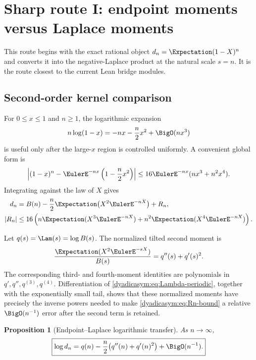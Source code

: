 \documentclass[11pt,oneside]{article}
\newtheorem{proposition}[proposition]{Proposition}
\theoremstyle{definition}
\theoremstyle{remark}
\begin{document}
\section{Sharp route I: endpoint moments versus Laplace moments}
\label{dyadicasym:sec:endpoint-laplace}

This route begins with the exact rational object $d_n=\Expectation(1-X)^n$ and converts it into the
negative-Laplace product at the natural scale $s=n$.  It is the route closest to the current
Lean bridge modules.

\subsection{Second-order kernel comparison}

For $0\le x\le1$ and $n\ge1$, the logarithmic expansion
\begin{equation*}
 n\log(1-x)=-nx-\frac n2x^2+\BigO(nx^3)
\end{equation*}
is useful only after the large-$x$ region is controlled uniformly.  A convenient global
form is
\begin{equation}
 \left|(1-x)^n-\EulerE^{-nx}\left(1-\frac n2x^2\right)\right|
 \le16\EulerE^{-nx}(nx^3+n^2x^4).                               \label{dyadicasym:eq:kernel-comparison}
\end{equation}
Integrating against the law of $X$ gives
\begin{align}
 d_n={}&B(n)-\frac n2\Expectation\bigl(X^2\EulerE^{-nX}\bigr)+R_n,        \label{dyadicasym:eq:dn-B-second}\\
 |R_n|\le{}&16\left(
 n\Expectation(X^3\EulerE^{-nX})+n^2\Expectation(X^4\EulerE^{-nX})\right).              \label{dyadicasym:eq:Rn-bound}
\end{align}

Let $q(s)=\Lam(s)=\log B(s)$.  The normalized tilted second moment is
\begin{equation}
 \frac{\Expectation(X^2\EulerE^{-sX})}{B(s)}=q''(s)+q'(s)^2.               \label{dyadicasym:eq:tilted-second}
\end{equation}
The corresponding third- and fourth-moment identities are polynomials in
$q',q'',q^{(3)},q^{(4)}$.  Differentiation of \eqref{dyadicasym:eq:Lambda-periodic}, together with the
exponentially small tail, shows that these normalized moments have precisely the inverse
powers needed to make \eqref{dyadicasym:eq:Rn-bound} a relative $\BigO(n^{-1})$ error after the second
term is retained.

\begin{proposition}[Endpoint--Laplace logarithmic transfer]
\label{dyadicasym:prop:endpoint-laplace-transfer}
As $n\to\infty$,
\begin{equation}
 \boxed{
 \log d_n=q(n)-\frac n2\bigl(q''(n)+q'(n)^2\bigr)
 +\BigO(n^{-1}).}                                          \label{dyadicasym:eq:log-d-transfer}
\end{equation}
\end{proposition}
\end{document}
